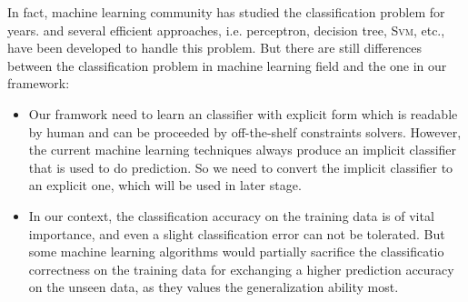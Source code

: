 In fact, machine learning community has studied the classification problem for years.
and several efficient approaches, i.e. perceptron, decision tree, \textsc{Svm}, etc., have been developed to handle this problem.
But there are still differences between the classification problem in machine learning field and the one in our framework:
\begin{itemize}
\item Our framwork need to learn an classifier with explicit form which is readable by human and can be proceeded by off-the-shelf constraints solvers.
However, the current machine learning techniques always produce an implicit classifier that is used to do prediction.
So we need to convert the implicit classifier to an explicit one, which will be used in later stage.
\item 
In our context, the classification accuracy on the training data is of vital importance,
and even a slight classification error can not be tolerated.
But some machine learning algorithms would partially sacrifice the classificatio correctness on the training data 
for exchanging a higher prediction accuracy on the unseen data,
as they values the generalization ability most.
\end{itemize} 
